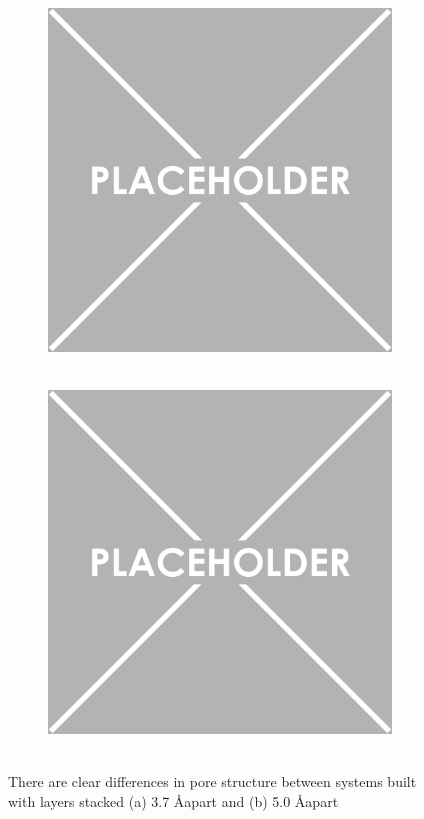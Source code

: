 \documentclass{article}
\newcommand{\angstrom}{\textup{\AA}}
\begin{document}
\begin{itemize}
	\begin{figure}
	\centering
	\begin{subfigure}{.45\textwidth}
		\centering
		\includegraphics[width=\linewidth]{placeholder.png}
		\caption{~\label{fig:phaseA}}
	\end{subfigure}
	\begin{subfigure}{.45\textwidth}
		\includegraphics[width=\linewidth]{placeholder.png}
		\centering
		\caption{~\label{fig:phaseB}}
	\end{subfigure}
	\caption{There are clear differences in pore structure between systems built with layers stacked (a) 3.7 \angstrom apart and (b) 5.0 \angstrom apart}
	\label{fig:porestructures}
	\end{figure}
	

\end{itemize}
\end{document}
